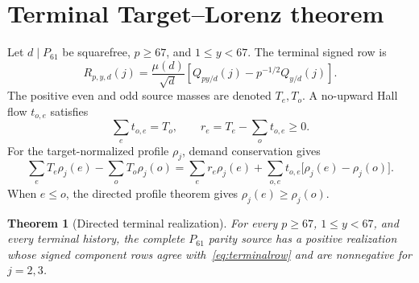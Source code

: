 \documentclass[11pt]{article}
\newtheorem{theorem}{Theorem}[section]
\begin{document}
\section{Terminal Target--Lorenz theorem}
\label{sec:terminal}

Let $d\mid P_{61}$ be squarefree, $p\ge67$, and $1\le y<67$.  The terminal signed row is
\begin{equation}
 R_{p,y,d}(j)=\frac{\mu(d)}{\sqrt d}
 \left[Q_{py/d}(j)-p^{-1/2}Q_{y/d}(j)\right].
\label{eq:terminalrow}
\end{equation}
The positive even and odd source masses are denoted $T_e,T_o$.  A no-upward Hall flow $t_{o,e}$ satisfies
\[
 \sum_e t_{o,e}=T_o,
 \qquad
 r_e=T_e-\sum_o t_{o,e}\ge0.
\]
For the target-normalized profile $\rho_j$, demand conservation gives
\begin{equation}
 \sum_eT_e\rho_j(e)-\sum_oT_o\rho_j(o)
 =\sum_e r_e\rho_j(e)
 +\sum_{o,e}t_{o,e}\bigl[\rho_j(e)-\rho_j(o)\bigr].
\label{eq:Hallrow}
\end{equation}
When $e\le o$, the directed profile theorem gives $\rho_j(e)\ge\rho_j(o)$.

\begin{theorem}[Directed terminal realization]
\label{thm:terminal}
For every $p\ge67$, $1\le y<67$, and every terminal history, the complete $P_{61}$ parity source has a positive realization whose signed component rows agree with~\eqref{eq:terminalrow} and are nonnegative for $j=2,3$.
\end{theorem}
\end{document}

